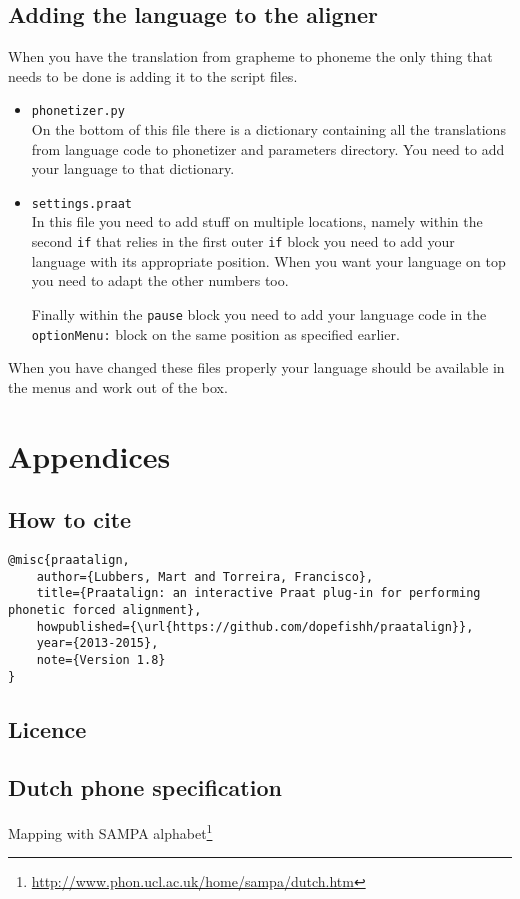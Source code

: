 \section{Adding the language to the aligner}
When you have the translation from grapheme to phoneme the only thing that
needs to be done is adding it to the script files.
\begin{itemize}
	\item \texttt{phonetizer.py}\\
		On the bottom of this file there is a dictionary containing all the
		translations from language code to phonetizer and parameters directory. You
		need to add your language to that dictionary.
	\item \texttt{settings.praat}\\
		In this file you need to add stuff on multiple locations, namely within the
		second \texttt{if} that relies in the first outer \texttt{if} block you
		need to add your language with its appropriate position. When you want your
		language on top you need to adapt the other numbers too.

		Finally within the \texttt{pause} block you need to add your language code
		in the \texttt{optionMenu:} block on the same position as specified
		earlier.
\end{itemize}
When you have changed these files properly your language should be available in
the menus and work out of the box.

\chapter{Appendices}
\section{How to cite}
\begin{lstlisting}[caption={Bibtex snippet},breaklines=true]
@misc{praatalign,
	author={Lubbers, Mart and Torreira, Francisco},
	title={Praatalign: an interactive Praat plug-in for performing phonetic forced alignment},
	howpublished={\url{https://github.com/dopefishh/praatalign}},
	year={2013-2015},
	note={Version 1.8}
}
\end{lstlisting}

\section{Licence}


\newpage
\section{Dutch phone specification}
\label{sec:sldutch}
Mapping with SAMPA
alphabet\footnote{\url{http://www.phon.ucl.ac.uk/home/sampa/dutch.htm}}

